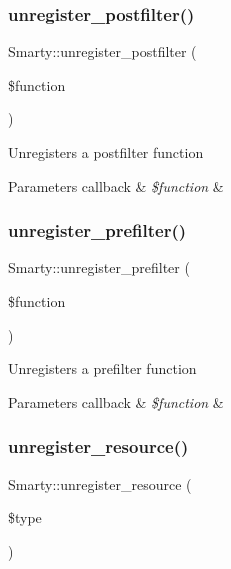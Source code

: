 \subsubsection{\texorpdfstring{unregister\+\_\+postfilter()}{unregister\_postfilter()}}
{\footnotesize\ttfamily Smarty\+::unregister\+\_\+postfilter (\begin{DoxyParamCaption}\item[{}]{\$function }\end{DoxyParamCaption})}

Unregisters a postfilter function


\begin{DoxyParams}[1]{Parameters}
callback & {\em \$function} & \\
\hline
\end{DoxyParams}
\mbox{\label{class_smarty_a2c799f52830b86afa153afaaa79028e2}} 
\subsubsection{\texorpdfstring{unregister\+\_\+prefilter()}{unregister\_prefilter()}}
{\footnotesize\ttfamily Smarty\+::unregister\+\_\+prefilter (\begin{DoxyParamCaption}\item[{}]{\$function }\end{DoxyParamCaption})}

Unregisters a prefilter function


\begin{DoxyParams}[1]{Parameters}
callback & {\em \$function} & \\
\hline
\end{DoxyParams}
\mbox{\label{class_smarty_aced4c3f27800c1a81c652fcf39fe9364}} 
\subsubsection{\texorpdfstring{unregister\+\_\+resource()}{unregister\_resource()}}
{\footnotesize\ttfamily Smarty\+::unregister\+\_\+resource (\begin{DoxyParamCaption}\item[{}]{\$type }\end{DoxyParamCaption})}

